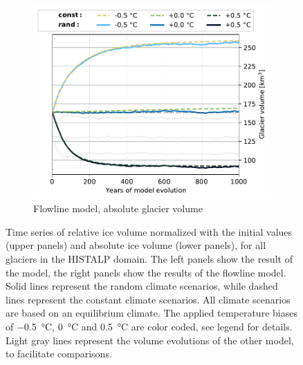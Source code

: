 \begin{figure}[t!]
\begin{subfigure}[b]{0.48\textwidth}
          \end{subfigure}
          \hfill
          \begin{subfigure}[b]{0.48\textwidth}
            \caption{Flowline model, absolute glacier volume}
            \label{fig:histalp_commitment:volume_abs_random}
            \centering
            \includegraphics[width=\textwidth]{../plots/final_plots/time_series/histalp_commitment/volume_abs_fl.pdf}
          \end{subfigure}
          
          \caption{Time series of relative ice volume normalized with the initial values (upper panels) and absolute ice volume (lower panels), for all glaciers in the HISTALP domain. The left panels show the result of the \vas{} model, the right panels show the results of the flowline model. Solid lines represent the random climate scenarios, while dashed lines represent the constant climate scenarios. All climate scenarios are based on an equilibrium climate. The applied temperature biases of \SI{-.5}{\celsius}, \SI{0}{\celsius} and \SI{+.5}{\celsius} are color coded, see legend for details. Light gray lines represent the volume evolutions of the other model, to facilitate comparisons.}
          \label{fig:histalp_commitment}
        \end{figure}

